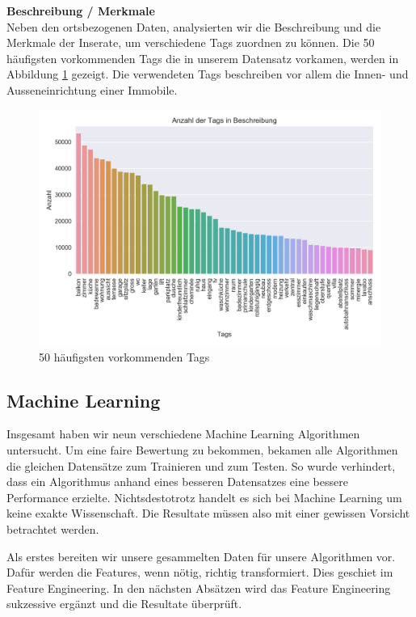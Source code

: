 \textbf{Beschreibung / Merkmale}\\
Neben den ortsbezogenen Daten, analysierten wir die Beschreibung und die Merkmale der Inserate, um verschiedene Tags zuordnen zu können. Die 50 häufigsten vorkommenden Tags die in unserem Datensatz vorkamen, werden in Abbildung \ref{fig:tags} gezeigt. Die verwendeten Tags beschreiben vor allem die Innen- und Ausseneinrichtung einer Immobile.
%
\begin{figure}[ht]
\centering
\includegraphics[width=\textwidth]{images/tags.png}
\caption[50 häufigsten vorkommenden Tags]{50 häufigsten vorkommenden Tags}%
\label{fig:tags}
\end{figure}

\subsection{Machine Learning}
Insgesamt haben wir neun verschiedene Machine Learning Algorithmen untersucht. Um eine faire Bewertung zu bekommen, bekamen alle Algorithmen die gleichen Datensätze zum Trainieren und zum Testen. So wurde verhindert, dass ein Algorithmus anhand eines besseren Datensatzes eine bessere Performance erzielte. Nichtsdestotrotz handelt es sich bei Machine Learning um keine exakte Wissenschaft. Die Resultate müssen also mit einer gewissen Vorsicht betrachtet werden.

Als erstes bereiten wir unsere gesammelten Daten für unsere Algorithmen vor. Dafür werden die Features, wenn nötig, richtig transformiert. Dies geschiet im Feature Engineering. In den nächsten Absätzen wird das Feature Engineering sukzessive ergänzt und die Resultate überprüft.


